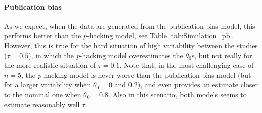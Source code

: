 \documentclass[preprint, authoryear]{elsarticle}
\theoremstyle{plain}
\theoremstyle{definition}
\begin{document}
\paragraph{Publication bias} As we expect, when the data are generated from the publication bias model, this performs better than the $p$-hacking model, see Table \ref{tab:Simulation_pb}. However, this is true for the hard situation of high variability between the studies ($\tau = 0.5$), in which the \emph{p}-hacking model overestimates the $\theta_0$s, but not really for the more realistic situation of $\tau = 0.1$. Note that, in the most challenging case of $n=5$, the \emph{p}-hacking model is never worse than the publication bias model (but for a larger variability when $\theta_0 = 0$ and $0.2$), and even provides an estimate closer to the nominal one when $\theta_0 = 0.8$. Also in this scenario, both models seems to estimate reasonably well $\tau$.
\end{document}
